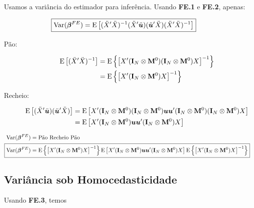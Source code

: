 \documentclass[11pt, oneside, a4paper, article]{article}
\numberwithin{equation}{section}
\begin{document}
Usamos a variância do estimador para inferência.
Usando \textbf{FE.1} e \textbf{FE.2}, apenas:

\vspace{-1 em}
\begin{align*} 
	\Aboxed{
\Var( \betavec^{FE} ) = 
\E \left[
( \ddot{X}' \ddot{X} )^{-1}
(\ddot{X}' \ddot{\uvec}) (\ddot{\uvec}' \ddot{X} )
( \ddot{X}' \ddot{X} )^{-1} 
\right]}
\end{align*}


\begin{description}
\item [Pão:]
\begin{align*}
\text{E}\left[ ( \ddot{X}' \ddot{X} )^{-1} \right] &=
\text{E} \left\{ \left[
X' ( \mathbf{I}_{N} \otimes \mathbf{M}^{0} ) ( \mathbf{I}_{N} \otimes \mathbf{M}^{0} ) X
\right]^{-1} \right\}
\\ &=
\text{E} \left\{ \left[
X' ( \mathbf{I}_{N} \otimes \mathbf{M}^{0} ) X
\right]^{-1} \right\}
\end{align*}

\item [Recheio:]
\begin{align*}
\text{E}\left[
(\ddot{X}' \ddot{\boldsymbol{u}}) (\ddot{\boldsymbol{u}}' \ddot{X} ) 
\right] 
&=
\text{E} \left[
X' ( \mathbf{I}_{N} \otimes \mathbf{M}^{0} ) ( \mathbf{I}_{N} \otimes \mathbf{M}^{0} ) 
\boldsymbol{u} \boldsymbol{u}'
( \mathbf{I}_{N} \otimes \mathbf{M}^{0} ) ( \mathbf{I}_{N} \otimes \mathbf{M}^{0} ) X
\right]
\\ &=
\text{E} \left[
X' ( \mathbf{I}_{N} \otimes \mathbf{M}^{0} ) \boldsymbol{u} \boldsymbol{u}' ( \mathbf{I}_{N} \otimes \mathbf{M}^{0} ) X
\right]
\end{align*}
\end{description}

\vspace{-1 em}
\begin{align*} 
\Var( \betavec^{FE} ) &= \text{Pão Recheio Pão}
\\ 
\Aboxed{
\Var( \betavec^{FE} ) &= 
\E \left\{ \left[
X' ( \Imat_{N} \otimes \Mzero ) X
\right]^{-1} \right\}
\E \left[
X' ( \Imat_{N} \otimes \Mzero ) \uvec \uvec' ( \Imat_{N} \otimes \Mzero ) X
\right]
\E \left\{ \left[
X' ( \Imat_{N} \otimes \Mzero ) X
\right]^{-1} \right\}
}
\end{align*}

\subsection{Variância sob Homocedasticidade}

Usando \textbf{FE.3}, temos
\end{document}
